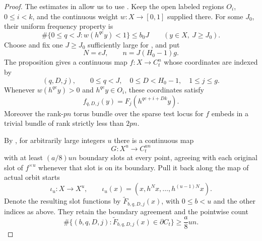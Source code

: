 \begin{proof}
The estimates in
allow us to use
.
Keep the open labeled regions $O_i$, $0\le i<k$, and the
continuous weight $w:X\to[0,1]$ supplied there.  For some $J_0$,
their uniform frequency property is
\begin{equation}
\label{eq:cover-macro-frequency}
 \#\{0\le q<J:w(h^{qe}y)<1\}\le b_0J
 \qquad(y\in X,\ J\ge J_0).
\end{equation}
Choose and fix one $J\ge J_0$ sufficiently large for
, and put
\[
 N=eJ,\qquad n=J(H_0-1)g.
\]
The proposition gives a continuous map
$f:X\to C_t^n$ whose coordinates are indexed by
\[
 (q,D,j),\qquad
 0\le q<J,\quad 0\le D<H_0-1,\quad 1\le j\le g.
\]
Whenever $w(h^{qe}y)>0$ and $h^{qe}y\in O_i$, these coordinates
satisfy
\begin{equation}
\label{eq:cover-aligned-f}
 f_{q,D,j}(y)=F_j(h^{qe+i+Dk}y).
\end{equation}
Moreover the rank-$pn$ torus bundle over the sparse test locus
for $f$ embeds in a trivial bundle of rank strictly less than
$2pn$.

By , for arbitrarily large integers
$u$ there is a continuous map
\[
 G:X^u\longrightarrow C_t^{un}
\]
with at least $(a/8)un$ boundary slots at every point, agreeing
with each original slot of $f^{\times u}$ whenever that slot is on its
boundary.  Pull it back along the map of actual orbit starts
\[
 \iota_u:X\longrightarrow X^u,
 \qquad
 \iota_u(x)=(x,h^Nx,\ldots,h^{(u-1)N}x).
\]
Denote the resulting slot functions by
$\widetilde F_{b,q,D,j}(x)$, with $0\le b<u$ and the other
indices as above.  They retain the boundary agreement and the
pointwise count
\begin{equation}
\label{eq:cover-total-successes}
 \#\{(b,q,D,j):\widetilde F_{b,q,D,j}(x)\in\partial C_t\}
 \ge\frac a8un.
\end{equation}


\end{proof}
